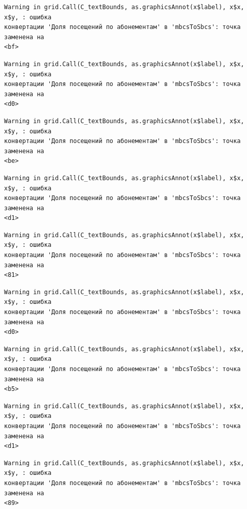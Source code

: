 \documentclass[
  letterpaper,
  DIV=11,
  numbers=noendperiod]{scrreprt}
\begin{document}
\begin{verbatim}
Warning in grid.Call(C_textBounds, as.graphicsAnnot(x$label), x$x, x$y, : ошибка
конвертации 'Доля посещений по абонементам' в 'mbcsToSbcs': точка заменена на
<bf>
\end{verbatim}

\begin{verbatim}
Warning in grid.Call(C_textBounds, as.graphicsAnnot(x$label), x$x, x$y, : ошибка
конвертации 'Доля посещений по абонементам' в 'mbcsToSbcs': точка заменена на
<d0>
\end{verbatim}

\begin{verbatim}
Warning in grid.Call(C_textBounds, as.graphicsAnnot(x$label), x$x, x$y, : ошибка
конвертации 'Доля посещений по абонементам' в 'mbcsToSbcs': точка заменена на
<be>
\end{verbatim}

\begin{verbatim}
Warning in grid.Call(C_textBounds, as.graphicsAnnot(x$label), x$x, x$y, : ошибка
конвертации 'Доля посещений по абонементам' в 'mbcsToSbcs': точка заменена на
<d1>
\end{verbatim}

\begin{verbatim}
Warning in grid.Call(C_textBounds, as.graphicsAnnot(x$label), x$x, x$y, : ошибка
конвертации 'Доля посещений по абонементам' в 'mbcsToSbcs': точка заменена на
<81>
\end{verbatim}

\begin{verbatim}
Warning in grid.Call(C_textBounds, as.graphicsAnnot(x$label), x$x, x$y, : ошибка
конвертации 'Доля посещений по абонементам' в 'mbcsToSbcs': точка заменена на
<d0>
\end{verbatim}

\begin{verbatim}
Warning in grid.Call(C_textBounds, as.graphicsAnnot(x$label), x$x, x$y, : ошибка
конвертации 'Доля посещений по абонементам' в 'mbcsToSbcs': точка заменена на
<b5>
\end{verbatim}

\begin{verbatim}
Warning in grid.Call(C_textBounds, as.graphicsAnnot(x$label), x$x, x$y, : ошибка
конвертации 'Доля посещений по абонементам' в 'mbcsToSbcs': точка заменена на
<d1>
\end{verbatim}

\begin{verbatim}
Warning in grid.Call(C_textBounds, as.graphicsAnnot(x$label), x$x, x$y, : ошибка
конвертации 'Доля посещений по абонементам' в 'mbcsToSbcs': точка заменена на
<89>
\end{verbatim}
\end{document}

